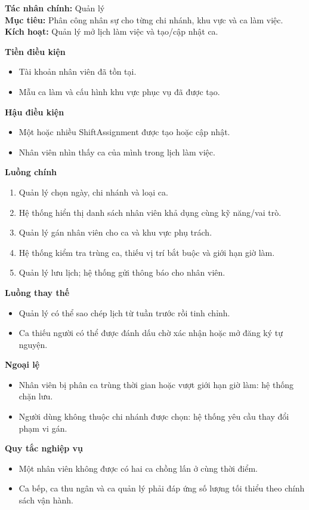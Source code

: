 \documentclass[11pt,a4paper]{article}
\begin{document}
    \begin{usecasebox}[title={UC-OPS-01 --- Quản lý ca làm nhân viên}]
    \textbf{Tác nhân chính:} Quản lý\\
    \textbf{Mục tiêu:} Phân công nhân sự cho từng chi nhánh, khu vực và ca làm việc.\\
    \textbf{Kích hoạt:} Quản lý mở lịch làm việc và tạo/cập nhật ca.

    \medskip
    \textbf{Tiền điều kiện}
    \begin{itemize}[leftmargin=1.8em]
  \item Tài khoản nhân viên đã tồn tại.
  \item Mẫu ca làm và cấu hình khu vực phục vụ đã được tạo.
\end{itemize}

    \textbf{Hậu điều kiện}
    \begin{itemize}[leftmargin=1.8em]
  \item Một hoặc nhiều \textsf{ShiftAssignment} được tạo hoặc cập nhật.
  \item Nhân viên nhìn thấy ca của mình trong lịch làm việc.
\end{itemize}

    \textbf{Luồng chính}
    \begin{enumerate}[leftmargin=1.8em]
  \item Quản lý chọn ngày, chi nhánh và loại ca.
  \item Hệ thống hiển thị danh sách nhân viên khả dụng cùng kỹ năng/vai trò.
  \item Quản lý gán nhân viên cho ca và khu vực phụ trách.
  \item Hệ thống kiểm tra trùng ca, thiếu vị trí bắt buộc và giới hạn giờ làm.
  \item Quản lý lưu lịch; hệ thống gửi thông báo cho nhân viên.
\end{enumerate}

    \textbf{Luồng thay thế}
    \begin{itemize}[leftmargin=1.8em]
  \item Quản lý có thể sao chép lịch từ tuần trước rồi tinh chỉnh.
  \item Ca thiếu người có thể được đánh dấu chờ xác nhận hoặc mở đăng ký tự nguyện.
\end{itemize}

    \textbf{Ngoại lệ}
    \begin{itemize}[leftmargin=1.8em]
  \item Nhân viên bị phân ca trùng thời gian hoặc vượt giới hạn giờ làm: hệ thống chặn lưu.
  \item Người dùng không thuộc chi nhánh được chọn: hệ thống yêu cầu thay đổi phạm vi gán.
\end{itemize}

    \textbf{Quy tắc nghiệp vụ}
    \begin{itemize}[leftmargin=1.8em]
  \item Một nhân viên không được có hai ca chồng lấn ở cùng thời điểm.
  \item Ca bếp, ca thu ngân và ca quản lý phải đáp ứng số lượng tối thiểu theo chính sách vận hành.
\end{itemize}
    \end{usecasebox}
\end{document}
